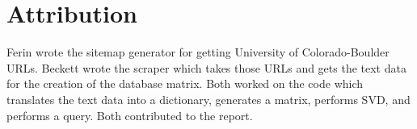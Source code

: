 \section{Attribution} \label{sec:attribute}
Ferin wrote the sitemap generator for getting University of Colorado-Boulder URLs. Beckett wrote the scraper 
which takes those URLs and gets the text data for the creation of the database matrix. 
Both worked on the code which translates the text data into a dictionary, generates a matrix, performs SVD, and performs a query. Both contributed to the report.